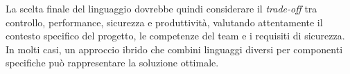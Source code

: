 La scelta finale del linguaggio dovrebbe quindi considerare il \textit{trade-off}
tra controllo, performance, sicurezza e produttività, valutando attentamente il contesto
specifico del progetto, le competenze del team e i requisiti di sicurezza. In molti
casi, un approccio ibrido che combini linguaggi diversi per componenti
specifiche può rappresentare la soluzione ottimale.